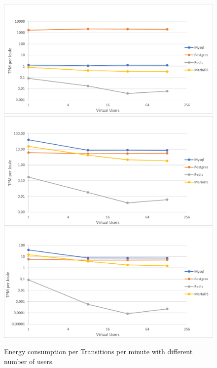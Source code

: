 \begin{figure}[h!]
\centering
\caption{Energy consumption per Transitions per minute with different number of users.}
\includegraphics[width=0.76\columnwidth]{results/vu/package-tpm.png}
\includegraphics[width=0.76\columnwidth]{results/vu/total-tpm.png}
\includegraphics[width=0.76\columnwidth]{results/vu/Disk-tpm.png}
\label{fig:vuyenergytpm}	
\end{figure}

